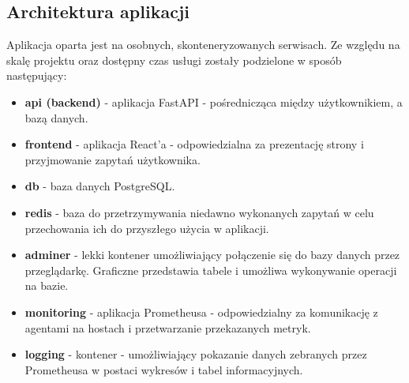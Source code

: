 \subsection{Architektura aplikacji}
\par
Aplikacja oparta jest na osobnych, skonteneryzowanych serwisach.
Ze względu na skalę projektu oraz dostępny czas usługi zostały podzielone w sposób następujący:
\begin{itemize}
    \item \textbf{api (backend)}  - aplikacja \gls{FastAPI} -  pośrednicząca między użytkownikiem, a bazą danych.
    \item \textbf{frontend} - aplikacja \gls{React}'a - odpowiedzialna za prezentację strony i przyjmowanie zapytań użytkownika.
    \item \textbf{db} - baza danych \gls{PostgreSQL}.
    \item \textbf{redis} - baza do przetrzymywania niedawno wykonanych zapytań w celu przechowania ich do przyszłego użycia w aplikacji.
    \item \textbf{adminer} - lekki \gls{kontener} umożliwiający połączenie się do bazy danych przez przeglądarkę. Graficzne przedstawia tabele i umożliwa wykonywanie operacji na bazie.
    \item \textbf{monitoring} - aplikacja \gls{Prometheus}a - odpowiedzialny za komunikację z agentami na hostach i przetwarzanie przekazanych metryk.
    \item \textbf{logging} - \gls{kontener}  - umożliwiający pokazanie danych zebranych przez \gls{Prometheus}a w postaci wykresów i tabel informacyjnych.
\end{itemize}
